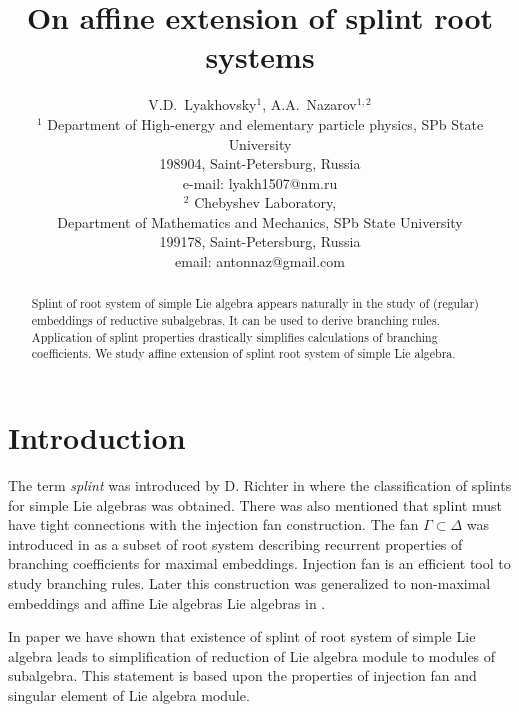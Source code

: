 \documentclass[12pt]{article}
\begin{document}
\title{On affine extension of splint root systems}



\author{V.D.~Lyakhovsky$^1$, A.A.~Nazarov$^{1,2}$ \\
  {\small $^1$ Department of High-energy and elementary particle physics, SPb State University}\\
  {\small 198904, Saint-Petersburg, Russia}\\
  {\small e-mail: lyakh1507@nm.ru}\\
  {\small$^{2}$ Chebyshev Laboratory,}\\
  {\small Department of Mathematics and Mechanics, SPb State University}\\
  {\small 199178, Saint-Petersburg, Russia}\\
  {\small email: antonnaz@gmail.com}}
\maketitle

\begin{abstract}
Splint of root system of simple Lie algebra appears naturally in
the study of (regular) embeddings of reductive subalgebras. It can
be used to derive branching rules. Application of
splint properties drastically simplifies calculations of
branching coefficients. We study affine extension of splint root system of simple Lie algebra.
\end{abstract}

\section{Introduction}
\label{sec:introduction}


The term {\it splint} was
introduced by D. Richter in  \cite{richter2008splints} where the
classification of splints for simple Lie algebras was obtained.
There was also mentioned that splint must have tight
connections with the injection fan construction. The fan $\Gamma
\subset \Delta$ was
introduced in \cite{lyakhovsky1996rra} as a subset of root system describing recurrent
properties of branching coefficients for maximal embeddings. Injection fan is an
efficient tool to study branching rules. Later this construction
was generalized to non-maximal embeddings and affine Lie algebras
Lie algebras in \cite{2010arXiv1007.0318L, ilyin812pbc}.

In paper \cite{2011arXiv1111.6787L} we have shown that existence of splint of root system of simple Lie algebra leads to simplification of reduction of Lie algebra module to modules of subalgebra. This statement is based upon the properties of injection fan and singular element of Lie algebra module. 
\end{document}
